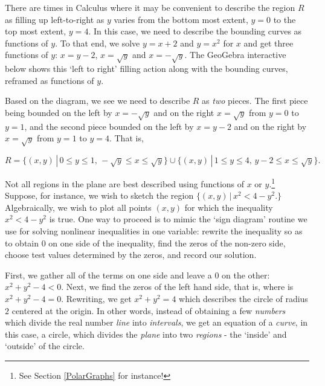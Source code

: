 \documentclass{ximera}
\begin{document}
There are times in Calculus where it may be convenient to describe the region $R$ as filling up left-to-right as $y$ varies from the bottom most extent, $y = 0$ to the top most extent, $y = 4$.  In this case, we need to describe the bounding curves as functions of $y$.  To that end, we solve $y = x+2$ and $y = x^2$ for $x$ and get three functions of $y$:  $x = y-2$, $x = \sqrt{y}$ and $x = -\sqrt{y}$.  The GeoGebra interactive below shows this `left to right' filling action along with the bounding curves, reframed as functions of $y$.

\begin{center}
\end{center}


Based on the diagram, we see we need to describe $R$ as \textit{two} pieces.  The first piece being bounded on the left by $x = -\sqrt{y}$ and on the right $x = \sqrt{y}$  from $y = 0$ to $y=1$, and the second piece bounded on the left by $x = y-2$ and on the right by $x= \sqrt{y}$ from $y = 1$ to $y = 4$.  That is,

    \[ R = \{ (x,y) \, | \, 0 \leq y \leq 1, \, -\sqrt{y} \leq x \leq \sqrt{y} \} \cup\{ (x,y) \, | \, 1 \leq y \leq 4, \, y-2 \leq x \leq \sqrt{y} \}. \]


Not all regions in the plane are best described using functions of $x$ or $y$.\footnote{See Section \ref{PolarGraphs} for instance!} Suppose, for instance,  we wish to sketch the region $\{ (x,y) \, | \,  x^2 < 4 - y^2. \}$  Algebraically, we wish to plot all points $(x,y)$ for which the inequality $x^2<4 - y^2$ is true.  One way to proceed is to mimic the `sign diagram' routine we use for solving nonlinear inequalities in one variable:   rewrite the inequality so as to obtain $0$ on one side of the inequality, find the zeros of the non-zero side, choose test values determined by the zeros, and record our solution.

First, we gather all of the terms on one side and leave a $0$ on the other:  $x^2 + y^2 -4 < 0$.  Next, we find the zeros of the left hand side, that is, where is $x^2 + y^2 - 4 = 0$.  Rewriting, we get $x^2+y^2 = 4$ which describes the circle of radius $2$ centered at the origin.  In other words, instead of obtaining a few \textit{numbers} which divide the real number \textit{line} into \textit{intervals}, we get an equation of a \textit{curve}, in this case, a circle, which divides the \textit{plane} into two \textit{regions} - the `inside' and `outside' of the circle.  
\end{document}
